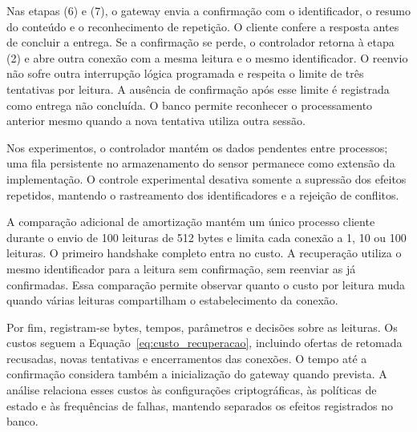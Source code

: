 Nas etapas (6) e (7), o gateway envia a confirmação com o identificador, o resumo do conteúdo e o reconhecimento de repetição. O cliente confere a resposta antes de concluir a entrega. Se a confirmação se perde, o controlador retorna à etapa (2) e abre outra conexão com a mesma leitura e o mesmo identificador. O reenvio não sofre outra interrupção lógica programada e respeita o limite de três tentativas por leitura. A ausência de confirmação após esse limite é registrada como entrega não concluída. O banco permite reconhecer o processamento anterior mesmo quando a nova tentativa utiliza outra sessão.

Nos experimentos, o controlador mantém os dados pendentes entre processos; uma fila persistente no armazenamento do sensor permanece como extensão da implementação. O controle experimental desativa somente a supressão dos efeitos repetidos, mantendo o rastreamento dos identificadores e a rejeição de conflitos.

A comparação adicional de amortização mantém um único processo cliente durante o envio de 100 leituras de 512 bytes e limita cada conexão a 1, 10 ou 100 leituras. O primeiro handshake completo entra no custo. A recuperação utiliza o mesmo identificador para a leitura sem confirmação, sem reenviar as já confirmadas. Essa comparação permite observar quanto o custo por leitura muda quando várias leituras compartilham o estabelecimento da conexão.

Por fim, registram-se bytes, tempos, parâmetros e decisões sobre as leituras. Os custos seguem a Equação~\ref{eq:custo_recuperacao}, incluindo ofertas de retomada recusadas, novas tentativas e encerramentos das conexões. O tempo até a confirmação considera também a inicialização do gateway quando prevista. A análise relaciona esses custos às configurações criptográficas, às políticas de estado e às frequências de falhas, mantendo separados os efeitos registrados no banco.
